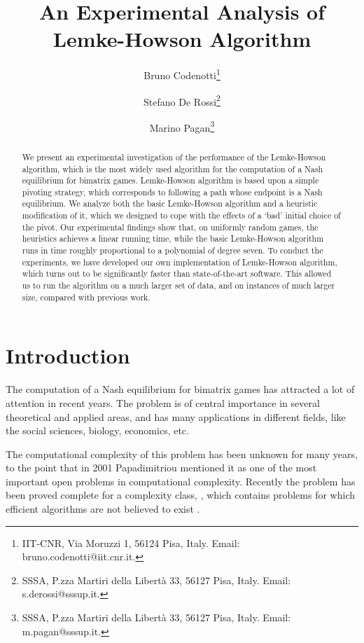 \documentclass[11pt]{article}
\begin{document}
\title{An Experimental Analysis of
Lemke-Howson Algorithm}
\author{
Bruno Codenotti\thanks{IIT-CNR, Via Moruzzi 1, 56124 Pisa, Italy. Email:
bruno.codenotti@iit.cnr.it.} \and Stefano De Rossi\thanks{SSSA,
P.zza Martiri della Libert\`a 33, 56127 Pisa, Italy. Email:
s.derossi@sssup.it.} \and Marino
Pagan\thanks{SSSA, P.zza Martiri della Libert\`a 33, 56127 Pisa,
Italy. Email: m.pagan@sssup.it.}}
\date{}
\maketitle

\begin{abstract}
We present an experimental investigation of the performance of the
Lemke-Howson algorithm, which is the most widely used algorithm for
the computation of a Nash equilibrium for bimatrix games.
Lemke-Howson algorithm is based upon a simple pivoting strategy,
which corresponds to following a path whose endpoint is a Nash
equilibrium. We analyze both the basic Lemke-Howson algorithm and a
heuristic modification of it, which we designed to cope with the
effects of a `bad' initial  choice of the pivot. Our experimental
findings show that, on uniformly random games, the heuristics
achieves a linear running time, while the basic Lemke-Howson
algorithm runs in time roughly proportional to a polynomial of
degree seven. To conduct the experiments, we have developed our own
implementation of Lemke-Howson algorithm, which turns out to be
significantly faster than state-of-the-art software. This allowed us
to run the algorithm on a much larger set of data, and on instances
of much larger size, compared with previous work.
\end{abstract}

\section{Introduction}

The computation of a Nash equilibrium for bimatrix games has
attracted a lot of attention in recent years. The problem is of
central importance in several theoretical and applied areas, and has
many applications in different fields, like the social sciences,
biology, economics, etc.

The computational complexity of this problem has been unknown for
many years, to the point that in 2001 Papadimitriou \cite{pap}
mentioned it as one of the most important open problems in
computational complexity. Recently the problem has been proved
complete for a complexity class, , which contains problems for
which efficient algorithms are not believed to exist
\cite{chendeng}.
\end{document}

